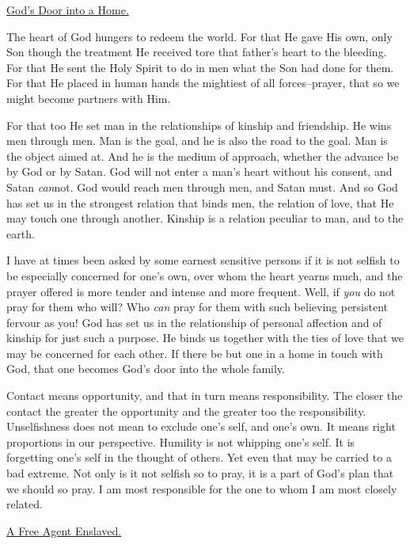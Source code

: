 \underline{God's Door into a Home.}


The heart of God hungers to redeem the world. For that He gave His own,
only Son though the treatment He received tore that father's heart to the
bleeding. For that He sent the Holy Spirit to do in men what the Son had
done for them. For that He placed in human hands the mightiest of all
forces--prayer, that so we might become partners with Him.

For that too He set man in the relationships of kinship and friendship. He
wins men through men. Man is the goal, and he is also the road to the
goal. Man is the object aimed at. And he is the medium of approach,
whether the advance be by God or by Satan. God will not enter a man's
heart without his consent, and Satan \textit{can}not. God would reach men through
men, and Satan must. And so God has set us in the strongest relation that
binds men, the relation of love, that He may touch one through another.
Kinship is a relation peculiar to man, and to the earth.

I have at times been asked by some earnest sensitive persons if it is not
selfish to be especially concerned for one's own, over whom the heart
yearns much, and the prayer offered is more tender and intense and more
frequent. Well, if \textit{you} do not pray for them who will? Who \textit{can} pray for
them with such believing persistent fervour as you! God has set us in the
relationship of personal affection and of kinship for just such a purpose.
He binds us together with the ties of love that we may be concerned for
each other. If there be but one in a home in touch with God, that one
becomes God's door into the whole family.

Contact means opportunity, and that in turn means responsibility. The
closer the contact the greater the opportunity and the greater too the
responsibility. Unselfishness does not mean to exclude one's self, and
one's own. It means right proportions in our perspective. Humility is not
whipping one's self. It is forgetting one's self in the thought of others.
Yet even that may be carried to a bad extreme. Not only is it not selfish
so to pray, it is a part of God's plan that we should so pray. I am most
responsible for the one to whom I am most closely related.



\underline{A Free Agent Enslaved.}


